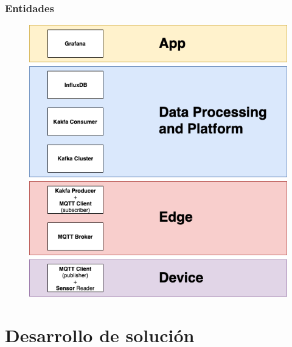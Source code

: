 \documentclass[12pt]{beamer}
\begin{document}
        \begin{frame}
            \frametitle{Entidades}

            \begin{figure}[]
                \centering
                \includegraphics[height=0.8\paperheight]{design}
            \end{figure}
            
        \end{frame}

        \section{Desarrollo de solución}
\end{document}
